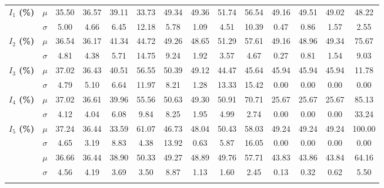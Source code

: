 \documentclass[preprint,12pt]{elsarticle}
\begin{document}
\begin{table}[htbp]
\begin{adjustbox}{max width=\textwidth}
\begin{tabular}{|c|c|cccc|cccc|cccc|}
\hline
{} 
   & $\mu$    & 35.50   & 36.57   & 39.11   & 33.73   & 49.34   & 49.36   & 51.74   & 56.54   & 49.16   & 49.51   & 49.02   & 48.22 \\
   & $\sigma$ & 5.00    & 4.66    & 6.45    & 12.18   & 5.78    & 1.09    & 4.51    & 10.39   & 0.47    & 0.86    & 1.57    & 2.55 \\
\hline
{} 
   & $\mu$    & 36.54   & 36.17   & 41.34   & 44.72   & 49.26   & 48.65   & 51.29   & 57.61   & 49.16   & 48.96   & 49.34   & 75.67 \\
   & $\sigma$ & 4.81    & 4.38    & 5.71    & 14.75   & 9.24    & 1.92    & 3.57    & 4.67    & 0.27    & 0.81    & 1.54    & 9.03 \\
\hline
{} 
   & $\mu$    & 37.02   & 36.43   & 40.51   & 56.55   & 50.39   & 49.12   & 44.47   & 45.64   & 45.94   & 45.94   & 45.94   & 11.78 \\
   & $\sigma$ & 4.79    & 5.10    & 6.64    & 11.97   & 8.21    & 1.28    & 13.33   & 15.42   & 0.00    & 0.00    & 0.00    & 0.00 \\
\hline
{} 
   & $\mu$    & 37.02   & 36.61   & 39.96   & 55.56   & 50.63   & 49.30   & 50.91   & 70.71   & 25.67   & 25.67   & 25.67   & 85.13 \\
   & $\sigma$ & 4.12    & 4.04    & 6.08    & 9.84    & 8.25    & 1.95    & 4.99    & 2.74    & 0.00    & 0.00    & 0.00    & 33.24 \\
\hline
{} 
   & $\mu$    & 37.24   & 36.44   & 33.59   & 61.07   & 46.73   & 48.04   & 50.43   & 58.03   & 49.24   & 49.24   & 49.24   & 100.00 \\
   & $\sigma$ & 4.65    & 3.19    & 8.83    & 4.38    & 13.92   & 0.63    & 5.87    & 16.05   & 0.00    & 0.00    & 0.00    & 0.00 \\
\hline
{} 
   & $\mu$    & 36.66   & 36.44   & 38.90   & 50.33   & 49.27   & 48.89   & 49.76   & 57.71   & 43.83   & 43.86   & 43.84   & 64.16 \\
   & $\sigma$ & 4.56    & 4.19    & 3.69    & 3.50    & 8.87    & 1.13    & 1.60    & 2.45    & 0.13    & 0.32    & 0.62    & 5.50 \\
\hline
{} 

\end{tabular}
\end{adjustbox}
\end{table}
\end{document}
